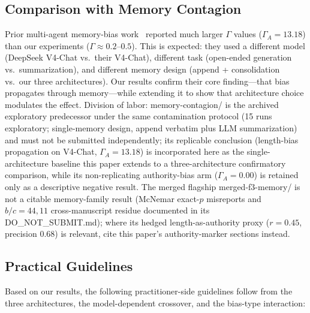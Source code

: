 \documentclass[11pt]{article}
\begin{document}
\subsection{Comparison with Memory Contagion}

Prior multi-agent memory-bias work~\cite{bertalanic2026cost,huang2026cagecal} reported much larger $\Gamma$ values ($\Gamma_A = 13.18$) than our experiments ($\Gamma \approx 0.2$--$0.5$). This is expected: they used a different model (DeepSeek V4-Chat vs.\ their V4-Chat), different task (open-ended generation vs.\ summarization), and different memory design (append + consolidation vs.\ our three architectures). Our results confirm their core finding---that bias propagates through memory---while extending it to show that architecture choice modulates the effect. Division of labor: memory-contagion/ is the archived exploratory predecessor under the same contamination protocol (15 runs exploratory; single-memory design, append verbatim plus LLM summarization) and must not be submitted independently; its replicable conclusion (length-bias propagation on V4-Chat, $\Gamma_A{=}13.18$) is incorporated here as the single-architecture baseline this paper extends to a three-architecture confirmatory comparison, while its non-replicating authority-bias arm ($\Gamma_A{=}0.00$) is retained only as a descriptive negative result. The merged flagship merged-f3-memory/ is not a citable memory-family result (McNemar exact-$p$ misreports and $b/c{=}44{,}11$ cross-manuscript residue documented in its DO\_NOT\_SUBMIT.md); where its hedged length-as-authority proxy ($r{=}0.45$, precision $0.68$) is relevant, cite this paper's authority-marker sections instead.

\subsection{Practical Guidelines}

Based on our results, the following practitioner-side guidelines follow from the three architectures, the model-dependent crossover, and the bias-type interaction:
\end{document}
